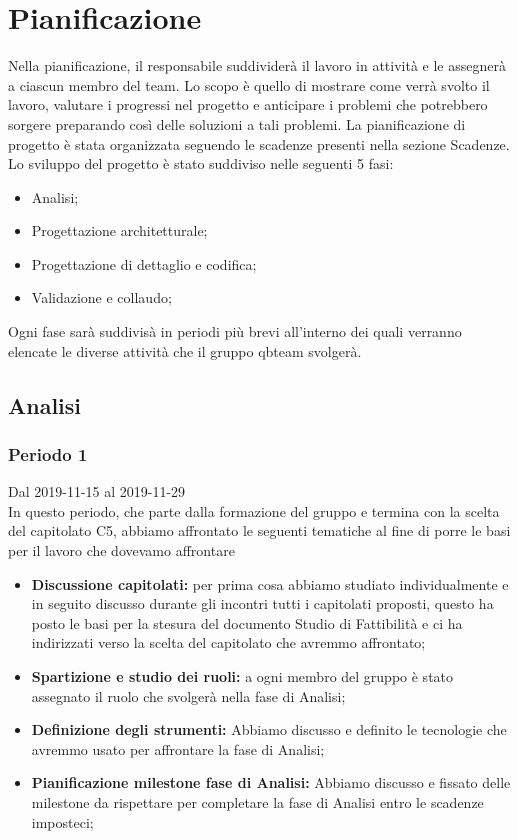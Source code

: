 \section{Pianificazione}
Nella pianificazione, il responsabile suddividerà il lavoro in attività e le assegnerà a ciascun membro del team.
Lo scopo è quello di mostrare come verrà svolto il lavoro, valutare i progressi nel progetto e anticipare i problemi che potrebbero sorgere preparando così delle soluzioni a tali problemi. 
La pianificazione di progetto è stata organizzata seguendo le scadenze presenti nella sezione Scadenze.
Lo sviluppo del progetto è stato suddiviso nelle seguenti 5 fasi: 
\begin{itemize}
	\item Analisi;
	\item Progettazione architetturale;
	\item Progettazione di dettaglio e codifica;
	\item Validazione e collaudo;
\end{itemize}
Ogni fase sarà suddivisà in periodi più brevi all'interno dei quali verranno elencate le diverse attività che il gruppo qbteam svolgerà.


\subsection{Analisi}

\subsubsection{Periodo 1} 
Dal 2019-11-15 al 2019-11-29\\
In questo periodo, che parte dalla formazione del gruppo e termina con la scelta del capitolato C5, abbiamo affrontato le seguenti tematiche al fine di porre le basi per il lavoro che dovevamo affrontare\\
\begin{itemize}
	\item \textbf{Discussione capitolati:} per prima cosa abbiamo studiato individualmente e in seguito discusso durante gli incontri tutti i capitolati proposti, questo ha posto le basi per la stesura del documento Studio di Fattibilità e ci ha indirizzati verso la scelta del capitolato che avremmo affrontato;
	\item \textbf{Spartizione e studio dei ruoli:} a ogni membro del gruppo è stato assegnato il ruolo che svolgerà nella fase di Analisi;
	\item \textbf{Definizione degli strumenti:} Abbiamo discusso e definito le tecnologie che avremmo usato per affrontare la fase di Analisi;
	\item \textbf{Pianificazione milestone fase di Analisi:} Abbiamo discusso e fissato delle milestone da rispettare per completare la fase di Analisi entro le scadenze imposteci;
\end{itemize}
